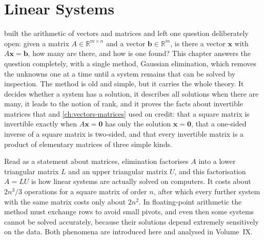 \chapter{Linear Systems}
\label{ch:linear-systems}


 built the arithmetic of vectors and matrices and left one question deliberately open: given a matrix $A\in\mathbb R^{m\times n}$ and a vector $\mathbf b\in\mathbb R^m$, is there a vector $\mathbf x$ with $A\mathbf x=\mathbf b$, how many are there, and how is one found? This chapter answers the question completely, with a single method, Gaussian elimination, which removes the unknowns one at a time until a system remains that can be solved by inspection. The method is old and simple, but it carries the whole theory. It decides whether a system has a solution, it describes all solutions when there are many, it leads to the notion of rank, and it proves the facts about invertible matrices that  and \cref{ch:vectors-matrices} used on credit: that a square matrix is invertible exactly when $A\mathbf x=\mathbf0$ has only the solution $\mathbf x=\mathbf 0$, that a one-sided inverse of a square matrix is two-sided, and that every invertible matrix is a product of elementary matrices of three simple kinds.

Read as a statement about matrices, elimination factorises $A$ into a lower triangular matrix $L$ and an upper triangular matrix $U$, and this factorisation $A=LU$ is how linear systems are actually solved on computers. It costs about $2n^3/3$ operations for a square matrix of order $n$, after which every further system with the same matrix costs only about $2n^2$. In floating-point arithmetic the method must exchange rows to avoid small pivots, and even then some systems cannot be solved accurately, because their solutions depend extremely sensitively on the data. Both phenomena are introduced here and analysed in Volume~IX.

